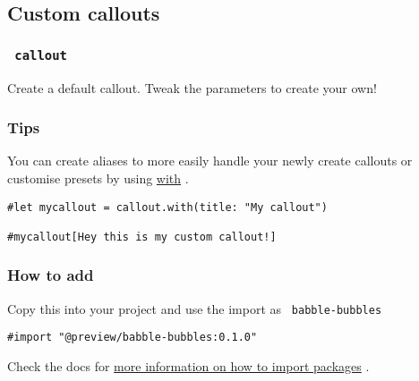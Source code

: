 \subsection{Custom callouts}\label{custom-callouts}

\subsubsection{\texorpdfstring{\texttt{\ callout\ }}{ callout }}\label{callout}

Create a default callout. Tweak the parameters to create your own!

\begin{Shaded}
\begin{Highlighting}[]
\end{Highlighting}
\end{Shaded}

\subsubsection{Tips}\label{tips}

You can create aliases to more easily handle your newly create callouts
or customise presets by using
\href{https://typst.app/docs/reference/types/function/\#methods-with}{with}
.

\begin{verbatim}
#let mycallout = callout.with(title: "My callout")

#mycallout[Hey this is my custom callout!]
\end{verbatim}

\subsubsection{How to add}\label{how-to-add}

Copy this into your project and use the import as
\texttt{\ babble-bubbles\ }

\begin{verbatim}
#import "@preview/babble-bubbles:0.1.0"
\end{verbatim}



Check the docs for
\href{https://typst.app/docs/reference/scripting/\#packages}{more
information on how to import packages} .

